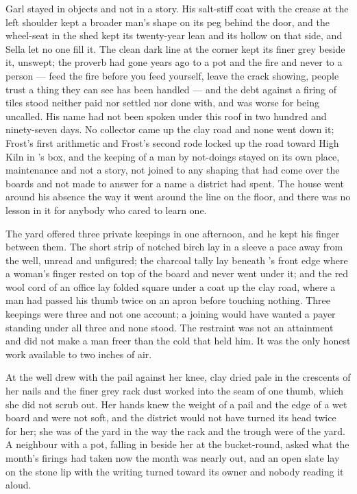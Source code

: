 Garl stayed in objects and not in a story. His salt-stiff coat with the crease at the left shoulder kept a broader man's shape on its peg behind the door, and the wheel-seat in the shed kept its twenty-year lean and its hollow on that side, and Sella let no one fill it. The clean dark line at the corner kept its finer grey beside it, unswept; the proverb had gone years ago to a pot and the fire and never to a person --- feed the fire before you feed yourself, leave the crack showing, people trust a thing they can see has been handled --- and the debt against a firing of tiles stood neither paid nor settled nor done with, and was worse for being uncalled. His name had not been spoken under this roof in two hundred and ninety-seven days. No collector came up the clay road and none went down it; Frost's first arithmetic and Frost's second rode locked up the road toward High Kiln in 's box, and the keeping of a man by not-doings stayed on its own place, maintenance and not a story, not joined to any shaping that had come over the boards and not made to answer for a name a district had spent. The house went around his absence the way it went around the line on the floor, and there was no lesson in it for anybody who cared to learn one.

The yard offered three private keepings in one afternoon, and he kept his finger between them. The short strip of notched birch lay in a sleeve a pace away from the well, unread and unfigured; the charcoal tally lay beneath 's front edge where a woman's finger rested on top of the board and never went under it; and the red wool cord of an office lay folded square under a coat up the clay road, where a man had passed his thumb twice on an apron before touching nothing. Three keepings were three and not one account; a joining would have wanted a payer standing under all three and none stood. The restraint was not an attainment and did not make a man freer than the cold that held him. It was the only honest work available to two inches of air.

\scenebreak

At the well  drew with the pail against her knee, clay dried pale in the crescents of her nails and the finer grey rack dust worked into the seam of one thumb, which she did not scrub out. Her hands knew the weight of a pail and the edge of a wet board and were not soft, and the district would not have turned its head twice for her; she was of the yard in the way the rack and the trough were of the yard. A neighbour with a pot, falling in beside her at the bucket-round, asked what the month's firings had taken now the month was nearly out, and an open slate lay on the stone lip with the writing turned toward its owner and nobody reading it aloud.

